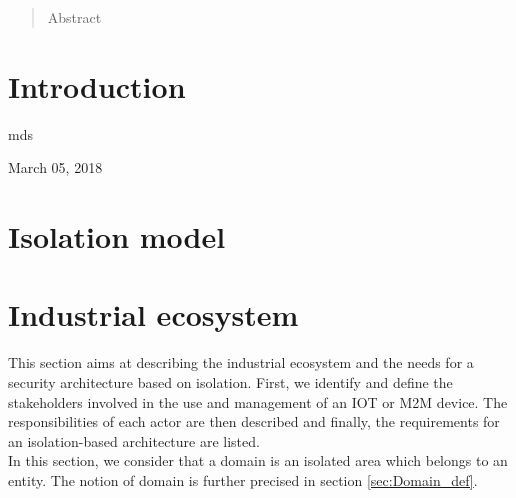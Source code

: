 \documentclass[conference]{IEEEtran}
\begin{document}
\maketitle

\begin{abstract}
Abstract 
\end{abstract}





%
\IEEEpeerreviewmaketitle



\section{Introduction}
\label{sec:Intro}
{}
\hfill mds
 
\hfill March 05, 2018

\section{Isolation model}
\label{sec:Isolation_model}

\section{Industrial ecosystem}
\label{sec:Industrial_ecosystem}
This section aims at describing the industrial ecosystem and the needs for a security architecture based on isolation. First, we identify and define the stakeholders involved in the use and management of an IOT or M2M device. The responsibilities of each actor are then described and finally, the requirements for an isolation-based architecture are listed.\\

In this section, we consider that a domain is an isolated area which belongs to an entity. The notion of domain is further precised in section \ref{sec:Domain_def}.\\
\end{document}
